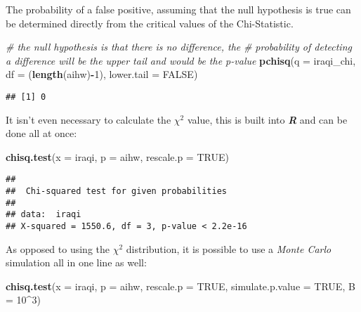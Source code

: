\documentclass[
]{article}
\newenvironment{Shaded}{\begin{snugshade}}{\end{snugshade}}
\newcommand{\CommentTok}[1]{\textcolor[rgb]{0.56,0.35,0.01}{\textit{#1}}}
\newcommand{\DataTypeTok}[1]{\textcolor[rgb]{0.13,0.29,0.53}{#1}}
\newcommand{\DecValTok}[1]{\textcolor[rgb]{0.00,0.00,0.81}{#1}}
\newcommand{\KeywordTok}[1]{\textcolor[rgb]{0.13,0.29,0.53}{\textbf{#1}}}
\newcommand{\NormalTok}[1]{#1}
\newcommand{\OperatorTok}[1]{\textcolor[rgb]{0.81,0.36,0.00}{\textbf{#1}}}
\newcommand{\OtherTok}[1]{\textcolor[rgb]{0.56,0.35,0.01}{#1}}
\begin{document}
The probability of a false positive, assuming that the null hypothesis
is true can be determined directly from the critical values of the
Chi-Statistic.

\begin{Shaded}
\begin{Highlighting}[]
\CommentTok{\# the null hypothesis is that there is no difference, the}
\CommentTok{\# probability of detecting a difference will be the upper tail and would be the p{-}value}
\KeywordTok{pchisq}\NormalTok{(}\DataTypeTok{q =}\NormalTok{ iraqi\_chi, }\DataTypeTok{df =}\NormalTok{ (}\KeywordTok{length}\NormalTok{(aihw)}\OperatorTok{{-}}\DecValTok{1}\NormalTok{), }\DataTypeTok{lower.tail =} \OtherTok{FALSE}\NormalTok{)}
\end{Highlighting}
\end{Shaded}

\begin{verbatim}
## [1] 0
\end{verbatim}

It isn't even necessary to calculate the \(\chi^2\) value, this is built
into \textbf{\emph{R}} and can be done all at once:

\begin{Shaded}
\begin{Highlighting}[]
\KeywordTok{chisq.test}\NormalTok{(}\DataTypeTok{x =}\NormalTok{ iraqi, }\DataTypeTok{p =}\NormalTok{ aihw, }\DataTypeTok{rescale.p =} \OtherTok{TRUE}\NormalTok{)}
\end{Highlighting}
\end{Shaded}

\begin{verbatim}
## 
##  Chi-squared test for given probabilities
## 
## data:  iraqi
## X-squared = 1550.6, df = 3, p-value < 2.2e-16
\end{verbatim}

As opposed to using the \(\chi^2\) distribution, it is possible to use a
\emph{Monte Carlo} simulation all in one line as well:

\begin{Shaded}
\begin{Highlighting}[]
\KeywordTok{chisq.test}\NormalTok{(}\DataTypeTok{x =}\NormalTok{ iraqi, }\DataTypeTok{p =}\NormalTok{ aihw, }\DataTypeTok{rescale.p =} \OtherTok{TRUE}\NormalTok{, }\DataTypeTok{simulate.p.value =} \OtherTok{TRUE}\NormalTok{, }\DataTypeTok{B =} \DecValTok{10}\OperatorTok{\^{}}\DecValTok{3}\NormalTok{)}
\end{Highlighting}
\end{Shaded}
\end{document}
